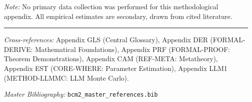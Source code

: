 \noindent\textit{Note:} No primary data collection was performed for this methodological
appendix. All empirical estimates are secondary, drawn from cited literature.



\vspace{1em}
\hrule
\vspace{0.5em}

\noindent\textit{Cross-references:}
Appendix GLS (Central Glossary),
Appendix DER (FORMAL-DERIVE: Mathematical Foundations),
Appendix PRF (FORMAL-PROOF: Theorem Demonstrations),
Appendix CAM (REF-META: Metatheory),
Appendix EST (CORE-WHERE: Parameter Estimation),
Appendix LLM1 (METHOD-LLMMC: LLM Monte Carlo).

\noindent\textit{Master Bibliography:} \texttt{bcm2\_master\_references.bib}

